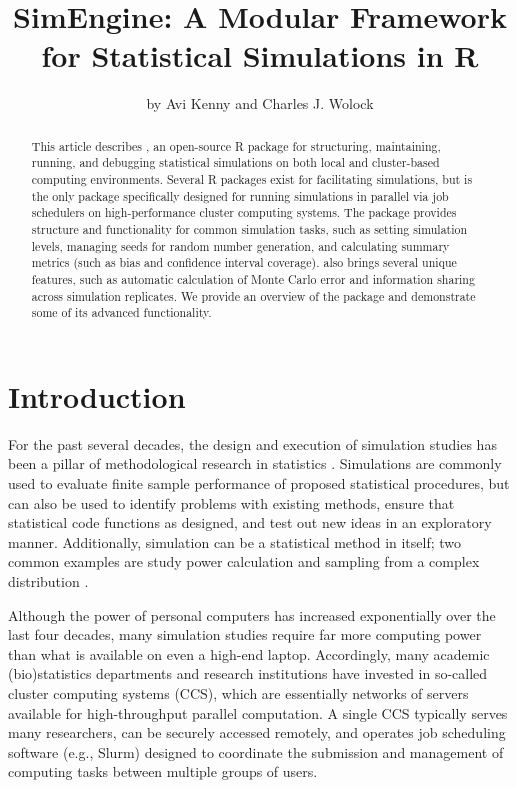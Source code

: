\title{SimEngine: A Modular Framework for Statistical Simulations in R}
\author{by Avi Kenny and Charles J. Wolock}

\maketitle

\begin{abstract}
This article describes , an open-source R package for structuring, maintaining, running, and debugging statistical simulations on both local and cluster-based computing environments. Several R packages exist for facilitating simulations, but  is the only package specifically designed for running simulations in parallel via job schedulers on high-performance cluster computing systems. The package provides structure and functionality for common simulation tasks, such as setting simulation levels, managing seeds for random number generation, and calculating summary metrics (such as bias and confidence interval coverage).  also brings several unique features, such as automatic calculation of Monte Carlo error and information sharing across simulation replicates. We provide an overview of the package and demonstrate some of its advanced functionality.
\end{abstract}

\section[Introduction]{Introduction} \label{sec:intro}

For the past several decades, the design and execution of simulation studies has been a pillar of methodological research in statistics \citep{hauck1984survey}. Simulations are commonly used to evaluate finite sample performance of proposed statistical procedures, but can also be used to identify problems with existing methods, ensure that statistical code functions as designed, and test out new ideas in an exploratory manner. Additionally, simulation can be a statistical method in itself; two common examples are study power calculation \citep{arnold2011simulation} and sampling from a complex distribution \citep{wakefield2013bayesian}.

Although the power of personal computers has increased exponentially over the last four decades, many simulation studies require far more computing power than what is available on even a high-end laptop. Accordingly, many academic (bio)statistics departments and research institutions have invested in so-called cluster computing systems (CCS), which are essentially networks of servers available for high-throughput parallel computation. A single CCS typically serves many researchers, can be securely accessed remotely, and operates job scheduling software (e.g., Slurm) designed to coordinate the submission and management of computing tasks between multiple groups of users.

